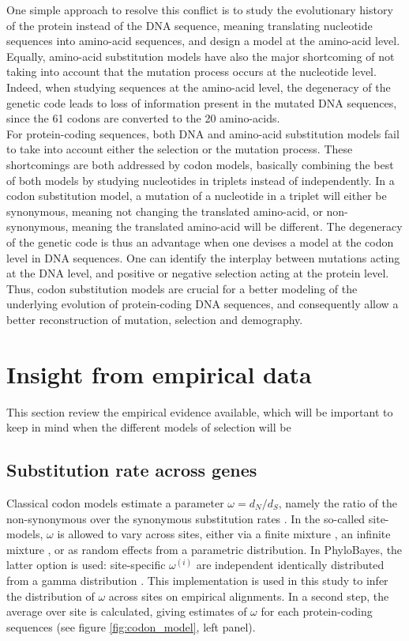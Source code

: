 One simple approach to resolve this conflict is to study the evolutionary history of the protein instead of the \acrshort{DNA} sequence, meaning translating nucleotide sequences into amino-acid sequences, and design a model at the amino-acid level.
Equally, amino-acid substitution models have also the major shortcoming of not taking into account that the mutation process occurs at the nucleotide level.
Indeed, when studying sequences at the amino-acid level, the degeneracy of the genetic code leads to loss of information present in the mutated \acrshort{DNA} sequences, since the 61 codons are converted to the 20 amino-acids.\\

For protein-coding sequences, both \acrshort{DNA} and amino-acid substitution models fail to take into account either the selection or the mutation process.
These shortcomings are both addressed by codon models, basically combining the best of both models by studying nucleotides in triplets instead of independently.
In a codon substitution model, a mutation of a nucleotide in a triplet will either be synonymous, meaning not changing the translated amino-acid, or non-synonymous, meaning the translated amino-acid will be different.
The degeneracy of the genetic code is thus an advantage when one devises a model at the codon level in \acrshort{DNA} sequences.
One can identify the interplay between mutations acting at the \acrshort{DNA} level, and positive or negative selection acting at the protein level.
Thus, codon substitution models are crucial for a better modeling of the underlying evolution of protein-coding \acrshort{DNA} sequences, and consequently allow a better reconstruction of mutation, selection and demography.

\section{Insight from empirical data}
This section review the empirical evidence available, which will be important to keep in mind when the different models of selection will be 

\subsection{Substitution rate across genes}
Classical codon models estimate a parameter $\omega=d_N/d_S$, namely the ratio of the non-synonymous over the synonymous substitution rates \cite{Muse1994,Goldman1994}. In the so-called site-models, $\omega$ is allowed to vary across sites, either via a finite mixture \cite{Yang2001}, an infinite mixture \cite{Huelsenbeck2006}, or as random effects from a parametric distribution. In PhyloBayes, the latter option is used: site-specific $\omega^{(i)}$ are independent identically distributed from a gamma distribution \cite{lartillot_phylobayes_2013}. This implementation is used in this study to infer the distribution of $\omega$ across sites on empirical alignments. In a second step, the average over site is calculated, giving estimates of $\omega$ for each protein-coding sequences (see figure \ref{fig:codon_model}, left panel).
	
